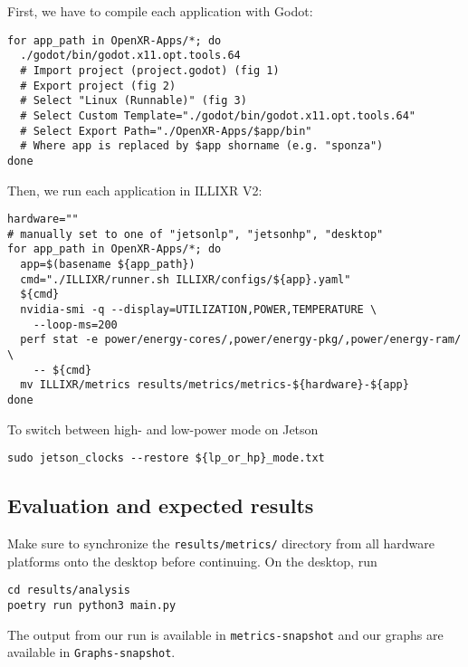 \documentclass{sigplanconf}
\begin{document}
First, we have to compile each application with Godot:

{
\footnotesize
\begin{verbatim}
for app_path in OpenXR-Apps/*; do
  ./godot/bin/godot.x11.opt.tools.64
  # Import project (project.godot) (fig 1)
  # Export project (fig 2)
  # Select "Linux (Runnable)" (fig 3)
  # Select Custom Template="./godot/bin/godot.x11.opt.tools.64"
  # Select Export Path="./OpenXR-Apps/$app/bin"
  # Where app is replaced by $app shorname (e.g. "sponza")
done
\end{verbatim}
}

Then, we run each application in ILLIXR V2:

{\scriptsize
\begin{verbatim}
hardware=""
# manually set to one of "jetsonlp", "jetsonhp", "desktop"
for app_path in OpenXR-Apps/*; do
  app=$(basename ${app_path})
  cmd="./ILLIXR/runner.sh ILLIXR/configs/${app}.yaml"
  ${cmd}
  nvidia-smi -q --display=UTILIZATION,POWER,TEMPERATURE \
    --loop-ms=200
  perf stat -e power/energy-cores/,power/energy-pkg/,power/energy-ram/ \
    -- ${cmd}
  mv ILLIXR/metrics results/metrics/metrics-${hardware}-${app}
done
\end{verbatim}
}

To switch between high- and low-power mode on Jetson

{\small
\begin{verbatim}
sudo jetson_clocks --restore ${lp_or_hp}_mode.txt
\end{verbatim}
}

\subsection{Evaluation and expected results}

Make sure to synchronize the \texttt{results/metrics/} directory from all hardware platforms onto the desktop before continuing. On the desktop, run

{\footnotesize
\begin{verbatim}
cd results/analysis
poetry run python3 main.py
\end{verbatim}
}

The output from our run is available in \texttt{metrics-snapshot} and our graphs are available in \texttt{Graphs-snapshot}.
\end{document}
